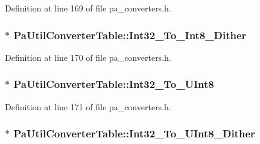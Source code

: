 Definition at line 169 of file pa\+\_\+converters.\+h.

\subsubsection[{\texorpdfstring{Int32\+\_\+\+To\+\_\+\+Int8\+\_\+\+Dither}{Int32_To_Int8_Dither}}]{$\ast$ Pa\+Util\+Converter\+Table\+::\+Int32\+\_\+\+To\+\_\+\+Int8\+\_\+\+Dither}\hypertarget{struct_pa_util_converter_table_a7b5fec6aef6cf4ad6d70301083f5107e}{}\label{struct_pa_util_converter_table_a7b5fec6aef6cf4ad6d70301083f5107e}


Definition at line 170 of file pa\+\_\+converters.\+h.

\subsubsection[{\texorpdfstring{Int32\+\_\+\+To\+\_\+\+U\+Int8}{Int32_To_UInt8}}]{$\ast$ Pa\+Util\+Converter\+Table\+::\+Int32\+\_\+\+To\+\_\+\+U\+Int8}\hypertarget{struct_pa_util_converter_table_afd0348c310748ad681344e775e4a6c80}{}\label{struct_pa_util_converter_table_afd0348c310748ad681344e775e4a6c80}


Definition at line 171 of file pa\+\_\+converters.\+h.

\subsubsection[{\texorpdfstring{Int32\+\_\+\+To\+\_\+\+U\+Int8\+\_\+\+Dither}{Int32_To_UInt8_Dither}}]{$\ast$ Pa\+Util\+Converter\+Table\+::\+Int32\+\_\+\+To\+\_\+\+U\+Int8\+\_\+\+Dither}\hypertarget{struct_pa_util_converter_table_a9660a8833606cd1f70796b11cced9496}{}\label{struct_pa_util_converter_table_a9660a8833606cd1f70796b11cced9496}


